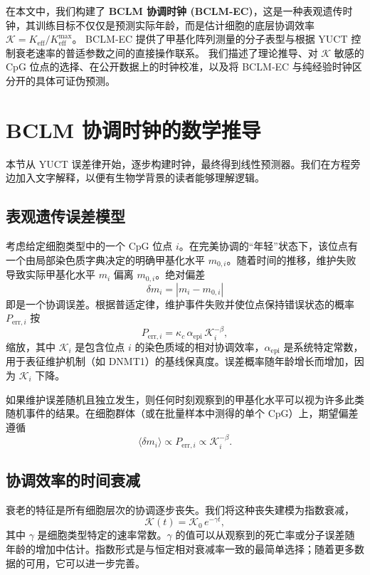 \documentclass[12pt,a4paper,fontset=fandol]{ctexart}
\newcommand{\REL}{\mathcal{K}}          %
\begin{document}
	在本文中，我们构建了 \textbf{BCLM 协调时钟 (BCLM‑EC)}，这是一种表观遗传时钟，其训练目标不仅仅是预测实际年龄，而是估计细胞的底层协调效率 \(\REL = K_{\mathrm{eff}}/K_{\mathrm{eff}}^{\max}\)。
	BCLM‑EC 提供了甲基化阵列测量的分子表型与根据 YUCT 控制衰老速率的普适参数之间的直接操作联系。
	我们描述了理论推导、对 \(\REL\) 敏感的 CpG 位点的选择、在公开数据上的时钟校准，以及将 BCLM‑EC 与纯经验时钟区分开的具体可证伪预测。
	
	\section{BCLM 协调时钟的数学推导}
	\label{sec:math}
	本节从 YUCT 误差律开始，逐步构建时钟，最终得到线性预测器。我们在方程旁边加入文字解释，以便有生物学背景的读者能够理解逻辑。
	
	\subsection{表观遗传误差模型}
	考虑给定细胞类型中的一个 CpG 位点 \(i\)。在完美协调的“年轻”状态下，该位点有一个由局部染色质字典决定的明确甲基化水平 \(m_{0,i}\)。随着时间的推移，维护失败导致实际甲基化水平 \(m_i\) 偏离 \(m_{0,i}\)。绝对偏差
	\[
	\delta m_i = |m_i - m_{0,i}|
	\]
	即是一个协调误差。根据普适定律，维护事件失败并使位点保持错误状态的概率 \(P_{\mathrm{err},i}\) 按
	\begin{equation}
		P_{\mathrm{err},i} = \kappa_c \, \alpha_{\mathrm{epi}} \, \REL_i^{-\beta},
		\label{eq:perr}
	\end{equation}
	缩放，其中 \(\REL_i\) 是包含位点 \(i\) 的染色质域的相对协调效率，\(\alpha_{\mathrm{epi}}\) 是系统特定常数，用于表征维护机制（如 DNMT1）的基线保真度。误差概率随年龄增长而增加，因为 \(\REL_i\) 下降。
	
	如果维护误差随机且独立发生，则任何时刻观察到的甲基化水平可以视为许多此类随机事件的结果。在细胞群体（或在批量样本中测得的单个 CpG）上，期望偏差遵循
	\[
	\langle \delta m_i \rangle \propto P_{\mathrm{err},i} \propto \REL_i^{-\beta}.
	\]
	
	\subsection{协调效率的时间衰减}
	衰老的特征是所有细胞层次的协调逐步丧失。我们将这种丧失建模为指数衰减，
	\begin{equation}
		\REL(t) = \REL_0 \, e^{-\gamma t},
		\label{eq:Kdecay}
	\end{equation}
	其中 \(\gamma\) 是细胞类型特定的速率常数。\(\gamma\) 的值可以从观察到的死亡率或分子误差随年龄的增加中估计。指数形式是与恒定相对衰减率一致的最简单选择；随着更多数据的可用，它可以进一步完善。
	
\end{document}
